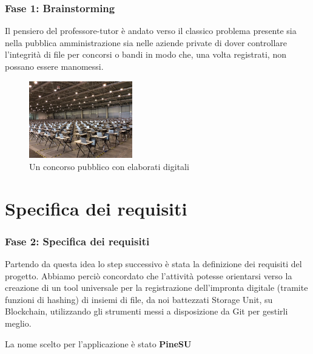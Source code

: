 \documentclass{beamer}
\begin{document}
\begin{frame}
	\frametitle{Fase 1: Brainstorming}
	Il pensiero del professore-tutor è andato verso il classico problema presente sia nella pubblica amministrazione sia nelle aziende private di dover controllare l’integrità di file per concorsi o bandi in modo che, una volta registrati, non possano essere manomessi.
	\medskip
	\begin{figure}
		\includegraphics[width=0.40\textwidth]{figures/concorso-fiera-di-roma.jpg}
		\caption{Un concorso pubblico con elaborati digitali}
	\end{figure}
\end{frame}
\section{Specifica dei requisiti}
\begin{frame}
	\frametitle{Fase 2: Specifica dei requisiti}
	Partendo da questa idea lo step successivo è stata la definizione dei requisiti del progetto. Abbiamo perciò concordato che l’attività potesse orientarsi verso la creazione di un tool universale per la registrazione dell’impronta digitale (tramite funzioni di hashing) di insiemi di file, da noi battezzati Storage Unit, su Blockchain, utilizzando gli strumenti messi a disposizione da Git per gestirli meglio.

	La nome scelto per l'applicazione è stato \textbf{PineSU}
\end{frame}
\end{document}
